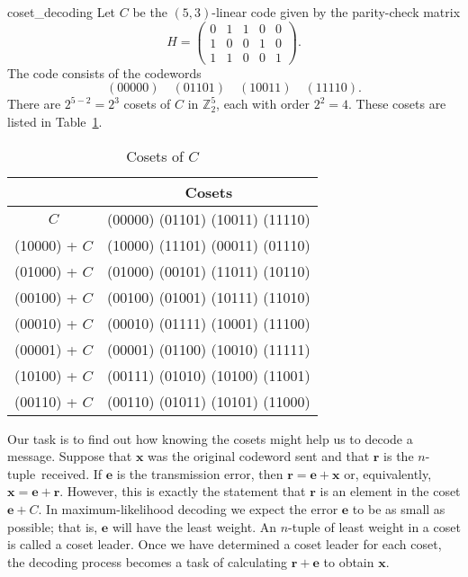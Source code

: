  
\begin{example}{coset_decoding}\label{CosetDecodeFix}
Let $C$ be the $(5,3)$-linear code given by the parity-check matrix
\[
H =
\begin{pmatrix}
0 & 1 & 1 & 0 & 0 \\
1 & 0 & 0 & 1 & 0 \\
1 & 1 & 0 & 0 & 1
\end{pmatrix}.
\]
The code consists of the codewords
\[
(00000) \quad (01101) \quad (10011) \quad (11110).
\]
There are $2^{5-2} = 2^3$ cosets of $C$ in ${\mathbb Z}_2^5$, each with
order $2^2 =4$.  These cosets are listed in Table~\ref{CosetsofC}. 
\end{example}


\begin{table}
{\small
\begin{center}
\medskip
\begin{tabular}{|c|c|}
\hline
 & Cosets \\
\hline
          $C$ & (00000)  (01101)  (10011)  (11110) \\
(10000) + $C$ & (10000)  (11101)  (00011)  (01110) \\
(01000) + $C$ & (01000)  (00101)  (11011)  (10110) \\
(00100) + $C$ & (00100)  (01001)  (10111)  (11010) \\
(00010) + $C$ & (00010)  (01111)  (10001)  (11100) \\
(00001) + $C$ & (00001)  (01100)  (10010)  (11111) \\
(10100) + $C$ & (00111)  (01010)  (10100)  (11001) \\
(00110) + $C$ & (00110)  (01011)  (10101)  (11000) \\
\hline
\end{tabular}
\end{center}
}
\caption{Cosets of $C$}\label{CosetsofC}
\end{table}
 
 

 
 
Our task is to find out how knowing the cosets might help us to 
decode a
message. Suppose that ${\mathbf x}$ was the original codeword sent and
that ${\mathbf r}$ is the \mbox{$n$-tuple received}. If ${\mathbf e}$ is the
transmission error, then ${\mathbf r} = {\mathbf e} + {\mathbf x}$ or,
equivalently, ${\mathbf x} = {\mathbf e} + {\mathbf r}$. However, this is
exactly the statement that ${\mathbf r}$ is an element in the coset 
${\mathbf e} + C$. In maximum-likelihood decoding we expect the error
${\mathbf e}$ to be as small as possible; that is, ${\mathbf e}$ will have
the least weight. An $n$-tuple of least weight in a coset is called a
{\bfi coset leader}. Once we have determined a
coset leader for each coset, the decoding process becomes a task
of calculating ${\mathbf r} + {\mathbf e}$ to obtain ${\mathbf x}$.
 
